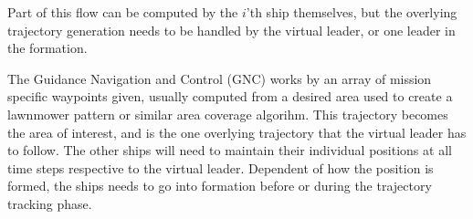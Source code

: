 \documentclass[conference]{IEEEtran}
\begin{document}
Part of this flow can be computed by the $i$'th ship themselves, but
the overlying trajectory generation needs to be handled by the virtual
leader, or one leader in the formation.

The Guidance Navigation and Control (GNC) works by an array of mission specific waypoints given,
usually computed from a desired area used to create a lawnmower
pattern or similar area coverage algorihm. This trajectory
becomes the area of interest, and is the one overlying trajectory that
the virtual leader has to follow. The other ships will need to
maintain their individual positions at all time steps respective to
the virtual leader. Dependent of how the position is formed, the ships
needs to go into formation before or during the trajectory tracking
phase.

%


\end{document}
